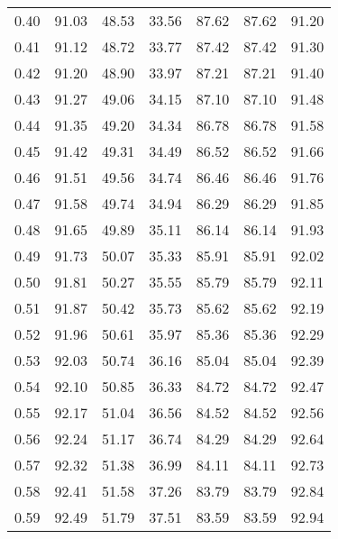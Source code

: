 \begin{tabular}{|c|c|c|c|c|c|c|}
      0.40 &     91.03 &     48.53 &      33.56 &   87.62 &      87.62 &         91.20 \\
      0.41 &     91.12 &     48.72 &      33.77 &   87.42 &      87.42 &         91.30 \\
      0.42 &     91.20 &     48.90 &      33.97 &   87.21 &      87.21 &         91.40 \\
      0.43 &     91.27 &     49.06 &      34.15 &   87.10 &      87.10 &         91.48 \\
      0.44 &     91.35 &     49.20 &      34.34 &   86.78 &      86.78 &         91.58 \\
      0.45 &     91.42 &     49.31 &      34.49 &   86.52 &      86.52 &         91.66 \\
      0.46 &     91.51 &     49.56 &      34.74 &   86.46 &      86.46 &         91.76 \\
      0.47 &     91.58 &     49.74 &      34.94 &   86.29 &      86.29 &         91.85 \\
      0.48 &     91.65 &     49.89 &      35.11 &   86.14 &      86.14 &         91.93 \\
      0.49 &     91.73 &     50.07 &      35.33 &   85.91 &      85.91 &         92.02 \\
      0.50 &     91.81 &     50.27 &      35.55 &   85.79 &      85.79 &         92.11 \\
      0.51 &     91.87 &     50.42 &      35.73 &   85.62 &      85.62 &         92.19 \\
      0.52 &     91.96 &     50.61 &      35.97 &   85.36 &      85.36 &         92.29 \\
      0.53 &     92.03 &     50.74 &      36.16 &   85.04 &      85.04 &         92.39 \\
      0.54 &     92.10 &     50.85 &      36.33 &   84.72 &      84.72 &         92.47 \\
      0.55 &     92.17 &     51.04 &      36.56 &   84.52 &      84.52 &         92.56 \\
      0.56 &     92.24 &     51.17 &      36.74 &   84.29 &      84.29 &         92.64 \\
      0.57 &     92.32 &     51.38 &      36.99 &   84.11 &      84.11 &         92.73 \\
      0.58 &     92.41 &     51.58 &      37.26 &   83.79 &      83.79 &         92.84 \\
      0.59 &     92.49 &     51.79 &      37.51 &   83.59 &      83.59 &         92.94 \\

\end{tabular}
